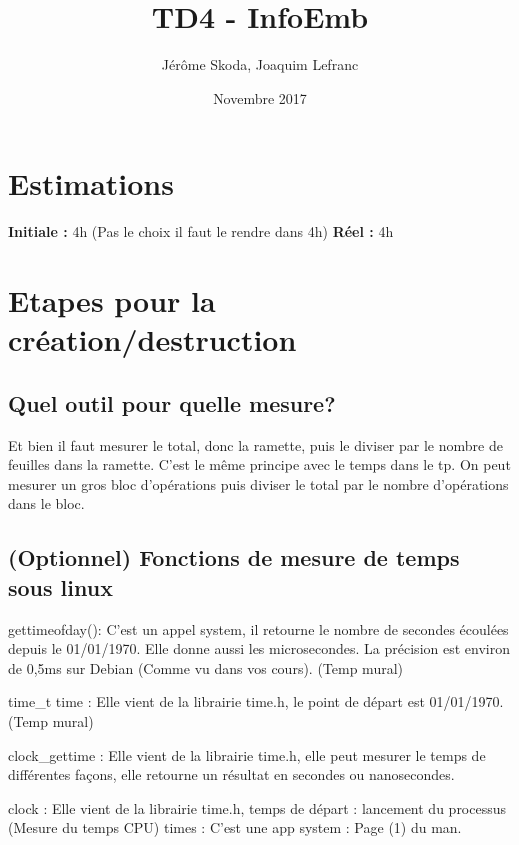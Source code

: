 \documentclass[12pt]{article}
\title{TD4 - InfoEmb}
\author{Jérôme Skoda, Joaquim Lefranc}
\date{Novembre 2017}
\begin{document}
\maketitle

\section{Estimations}
\textbf{Initiale :} 4h (Pas le choix il faut le rendre dans 4h) \newline
\textbf{Réel :} 4h

\section{Etapes pour la création/destruction}

	\subsection{Quel outil pour quelle mesure?}
		Et bien il faut mesurer le total, donc la ramette, puis le diviser par le nombre de feuilles dans la ramette. C'est le même principe avec le temps dans le tp. On peut mesurer un gros bloc d'opérations puis diviser le total par le nombre d'opérations dans le bloc.

	\subsection{(Optionnel) Fonctions de mesure de temps sous linux}

	gettimeofday(): C'est un appel system, il retourne le nombre de secondes écoulées depuis le 01/01/1970. Elle donne aussi les microsecondes. La précision est environ de 0,5ms sur Debian (Comme vu dans vos cours). (Temp mural)
	\newline

	time\_t time : Elle vient de la librairie time.h, le point de départ est 01/01/1970. (Temp mural)
	\newline

	clock\_gettime : Elle vient de la librairie time.h, elle peut mesurer le temps de différentes façons, elle retourne un résultat en secondes ou nanosecondes.
	\newline

	clock : Elle vient de la librairie time.h, temps de départ : lancement du processus (Mesure du temps CPU)
	\newline
	times : C'est une app system : Page (1) du man.
	\newline
\end{document}
